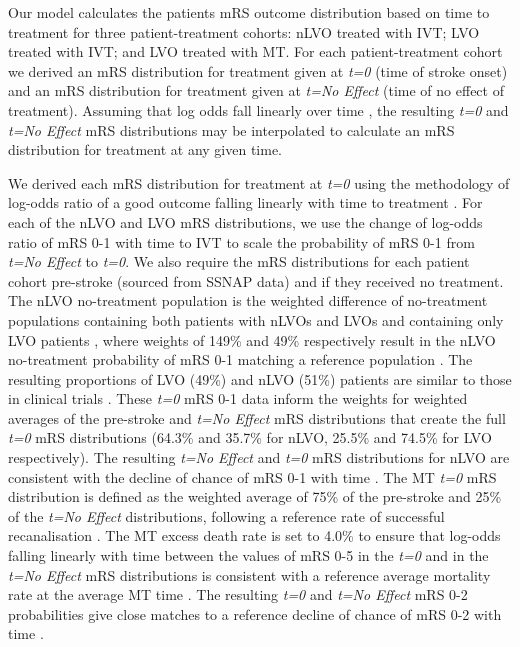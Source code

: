 Our model calculates the patients mRS outcome distribution  based on time to treatment for three patient-treatment cohorts: nLVO treated with IVT; LVO treated with IVT; and LVO treated with MT. For each patient-treatment cohort we derived an mRS distribution for treatment given at \emph{t=0} (time of stroke onset) and an mRS distribution for treatment given at \emph{t=No Effect} (time of no effect of treatment). Assuming that log odds fall linearly over time \cite{emberson_effect_2014, fransen_time_2016}, the resulting \textit{t=0} and \textit{t=No Effect} mRS distributions may be interpolated to calculate an mRS distribution for treatment at any given time.

We derived each mRS distribution for treatment at \emph{t=0} using the methodology of log-odds ratio of a good outcome falling linearly with time to treatment \cite{emberson_effect_2014, fransen_time_2016}. For each of the nLVO and LVO mRS distributions, we use the change of log-odds ratio of mRS 0-1 with time to IVT \cite{emberson_effect_2014} to scale the probability of mRS 0-1 from \emph{t=No Effect} to \emph{t=0}. We also require the mRS distributions for each patient cohort pre-stroke (sourced from SSNAP data) and if they received no treatment. The nLVO no-treatment population is the weighted difference of no-treatment populations containing both patients with nLVOs and LVOs \cite{lees_time_2010} and containing only LVO patients \cite{goyal_endovascular_2016}, where weights of 149\% and 49\% respectively result in the nLVO no-treatment probability of mRS 0-1 matching a reference population \cite{emberson_effect_2014}. The resulting proportions of LVO (49\%) and nLVO (51\%) patients are similar to those in clinical trials \cite{ist-3_collaborative_group_benefits_2012, emberson_effect_2014}. 
These \emph{t=0} mRS 0-1 data inform the weights for weighted averages of the pre-stroke and \emph{t=No Effect} mRS distributions that create the full \emph{t=0} mRS distributions (64.3\% and 35.7\% for nLVO, 25.5\% and 74.5\% for LVO respectively). The resulting \emph{t=No Effect} and \emph{t=0} mRS distributions for nLVO are consistent with the decline of chance of mRS 0-1 with time \cite{holodinsky_modeling_2018}. The MT \emph{t=0} mRS distribution is defined as the weighted average of 75\% of the pre-stroke and 25\% of the \emph{t=No Effect} distributions, following a reference rate of successful recanalisation \cite{hui_efficacy_2020}. The MT excess death rate is set to 4.0\% to ensure that log-odds falling linearly with time between the values of mRS 0-5 in the \emph{t=0} and in the \emph{t=No Effect} mRS distributions is consistent with a reference average mortality rate at the average MT time \cite{goyal_endovascular_2016}. The resulting \emph{t=0} and \emph{t=No Effect} mRS 0-2 probabilities give close matches to a reference decline of chance of mRS 0-2 with time \cite{fransen_time_2016}.


